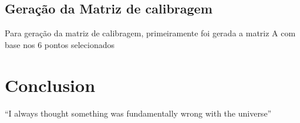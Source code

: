 \documentclass{article}
\begin{document}
    \subsection{Geração da Matriz de calibragem}
    Para geração da matriz de calibragem, primeiramente foi gerada a matriz A com base nos 6 pontos selecionados

\section{Conclusion}
``I always thought something was fundamentally wrong with the universe'' \citep{adams1995hitchhiker}



\end{document}
